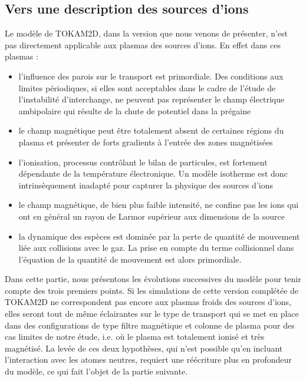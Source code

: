 \begin{refsection}
\section{Vers une description des sources d'ions}

Le modèle de TOKAM2D, dans la version que nous venons de présenter, n'est pas
directement applicable aux plasmas des sources d'ions. En effet dans
ces plasmas :

\begin{itemize}
	\item l'influence des parois sur le transport est primordiale. Des conditions
	aux limites périodiques, si elles sont acceptables dans le cadre de l'étude de
	l'instabilité d'interchange, ne peuvent pas représenter le champ électrique
	ambipolaire qui résulte de la chute de potentiel dans la prégaine
	\item le champ magnétique peut être
	totalement absent de certaines régions du plasma et présenter de forts
	gradients à l'entrée des zones magnétisées
	\item l'ionisation, processus contrôlant le bilan de particules, est fortement
	dépendante de la température électronique. Un modèle isotherme est donc
	intrinsèquement inadapté pour capturer la physique des sources d'ions
	\item le champ magnétique, de bien plus faible
	intensité, ne confine pas les ions qui ont en général un rayon de Larmor
	supérieur aux dimensions de la source
	\item la dynamique des espèces est dominée par la perte de
	quantité de mouvement liée aux collisions avec le gaz. La
	prise en compte du terme collisionnel dans l'équation de la quantité de
	mouvement est alors primordiale.
\end{itemize}

Dans cette partie, nous présentons les évolutions successives du modèle pour
tenir compte des trois premiers points. 
Si les simulations de
cette version complétée de TOKAM2D ne correspondent pas encore aux plasmas
froids des sources d'ions, elles seront tout de même éclairantes sur le type de
transport qui se met en place dans des configurations de type filtre magnétique
et colonne de plasma pour des cas limites de notre étude, i.e. où le plasma est
totalement ionisé et très magnétisé. La levée de ces deux hypothèses,
qui n'est possible qu'en incluant l'interaction avec les atomes neutres,
requiert une réécriture plus en profondeur du modèle, ce qui fait l'objet de la
partie suivante.


\end{refsection}
